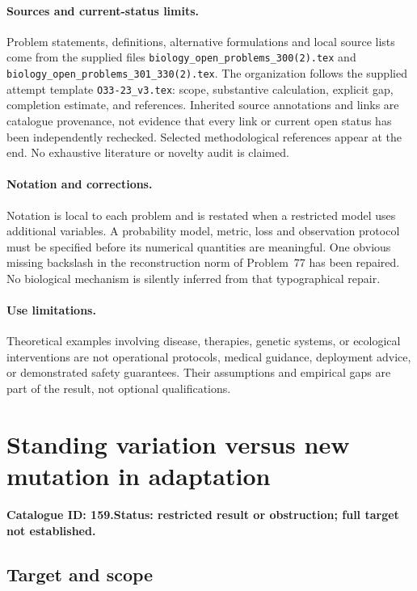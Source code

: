 \documentclass[11pt]{article}
\begin{document}
\paragraph{Sources and current-status limits.}
Problem statements, definitions, alternative formulations and local source lists
come from the supplied files
\texttt{biology\_open\_problems\_300(2).tex} and
\texttt{biology\_open\_problems\_301\_330(2).tex}.
The organization follows the supplied attempt template
\texttt{O33-23\_v3.tex}: scope, substantive calculation, explicit gap,
completion estimate, and references. Inherited source annotations and links are
catalogue provenance, not evidence that every link or current open status has
been independently rechecked. Selected methodological references appear at the
end. No exhaustive literature or novelty audit is claimed.

\paragraph{Notation and corrections.}
Notation is local to each problem and is restated when a restricted model uses
additional variables. A probability model, metric, loss and observation protocol
must be specified before its numerical quantities are meaningful. One obvious
missing backslash in the reconstruction norm of Problem~77 has been repaired.
No biological mechanism is silently inferred from that typographical repair.

\paragraph{Use limitations.}
Theoretical examples involving disease, therapies, genetic systems, or ecological
interventions are not operational protocols, medical guidance, deployment advice,
or demonstrated safety guarantees. Their assumptions and empirical gaps are part
of the result, not optional qualifications.

\setcounter{section}{158}
\section{Standing variation versus new mutation in adaptation}
\label{prob:159}
\noindent\textbf{Catalogue ID: 159.}\quad \textbf{Status: restricted result or obstruction; full target not established.}
\subsection{Target and scope}
\end{document}
